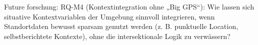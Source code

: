 



Future forschung:
RQ-M4 (Kontextintegration ohne „Big GPS“): Wie lassen sich situative Kontextvariablen der Umgebung sinnvoll integrieren, wenn Standortdaten bewusst sparsam genutzt werden (z. B. punktuelle Location, selbstberichtete Kontexte), ohne die intersektionale Logik zu verwässern?



